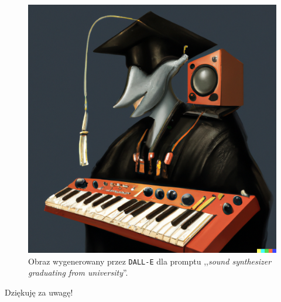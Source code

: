 \documentclass[]{beamer}
\begin{document}
\begin{frame}

  \vspace{-0.5cm}
  \begin{figure}
    \includegraphics[width=0.4\linewidth]{./synth_graduating_from_uni.png}
    \caption{Obraz wygenerowany przez \texttt{DALL-E} dla promptu ,,\textit{sound synthesizer graduating from university}''.}
  \end{figure}

  \centering
  \Large
  Dziękuję za uwagę!
\end{frame}



\end{document}
